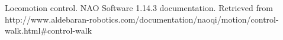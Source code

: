 \begin{thebibliography}{9}

   Locomotion control. 
   NAO Software 1.14.3 documentation. 
   Retrieved from http://www.aldebaran-robotics.com/documentation/naoqi/motion/control-walk.html\#control-walk

\end{thebibliography}
